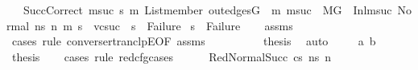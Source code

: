 \begin{isabellebody}
\ \ \ SuccCorrect{\isacharcolon}{\kern0pt}{\isachardoublequoteopen}{\isasymAnd}\ msuc\ s{}\ m{}{\isachardot}{\kern0pt}\ List{\isachardot}{\kern0pt}member\ {\isacharparenleft}{\kern0pt}out{\isacharunderscore}{\kern0pt}edges{\isacharparenleft}{\kern0pt}G{\isacharparenright}{\kern0pt}\ {\isacharbang}{\kern0pt}\ m{\isacharparenright}{\kern0pt}\ msuc\ {\isasymLongrightarrow}\ M{\isacharcomma}{\kern0pt}{\isasymLambda}{\isacharcomma}{\kern0pt}{\isasymGamma}{\isacharcomma}{\kern0pt}{\isasymOmega}{\isacharcomma}{\kern0pt}G\ {\isasymturnstile}\ {\isacharparenleft}{\kern0pt}Inl{\isacharparenleft}{\kern0pt}msuc{\isacharparenright}{\kern0pt}{\isacharcomma}{\kern0pt}\ Normal\ n{\isacharunderscore}{\kern0pt}s{\isacharparenright}{\kern0pt}\ {\isacharminus}{\kern0pt}n{\isasymrightarrow}{\isacharasterisk}{\kern0pt}\ {\isacharparenleft}{\kern0pt}m{}{\isacharcomma}{\kern0pt}\ s{}{\isacharparenright}{\kern0pt}\ {\isasymLongrightarrow}\ vcsuc\ {\isasymLongrightarrow}\ s{}\ {\isasymnoteq}\ Failure{\isachardoublequoteclose}\isanewline
{}\ {\isachardoublequoteopen}s{\isacharprime}{\kern0pt}\ {\isasymnoteq}\ Failure{\isachardoublequoteclose}\isanewline
%
\isadelimproof
\ \ %
\endisadelimproof
%
\isatagproof
{}\isamarkupfalse%
\ assms\isanewline
{}\isamarkupfalse%
\ {\isacharparenleft}{\kern0pt}cases\ rule{\isacharcolon}{\kern0pt}\ converse{\isacharunderscore}{\kern0pt}rtranclpE{}{\isacharbrackleft}{\kern0pt}OF\ assms{\isacharparenleft}{\kern0pt}{}{\isacharparenright}{\kern0pt}{\isacharbrackright}{\kern0pt}{\isacharparenright}{\kern0pt}\isanewline
\ \ \isamarkupfalse%
\ {}\isanewline
\ \ \isamarkupfalse%
\ \isamarkupfalse%
\ {\isacharquery}{\kern0pt}thesis\ \isamarkupfalse%
\ auto\isanewline
{}\isamarkupfalse%
\isanewline
\ \ \isamarkupfalse%
\ {\isacharparenleft}{\kern0pt}{}\ a\ b{\isacharparenright}{\kern0pt}\isanewline
\ \ \isamarkupfalse%
\ \isamarkupfalse%
\ {\isacharquery}{\kern0pt}thesis\isanewline
\ \ \isamarkupfalse%
\ {\isacharparenleft}{\kern0pt}cases\ rule{\isacharcolon}{\kern0pt}\ red{\isacharunderscore}{\kern0pt}cfg{\isachardot}{\kern0pt}cases{\isacharparenright}{\kern0pt}\isanewline
\ \ \ \ \isamarkupfalse%
\ {\isacharparenleft}{\kern0pt}RedNormalSucc\ cs\ ns{\isacharprime}{\kern0pt}\ n{\isacharprime}{\kern0pt}{\isacharparenright}{\kern0pt}\isanewline

\end{isabellebody}
